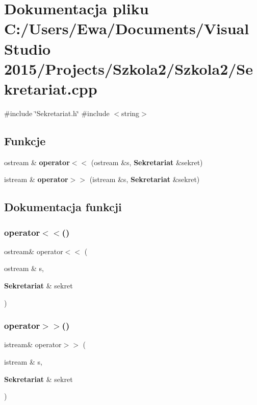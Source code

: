 \section{Dokumentacja pliku C\+:/\+Users/\+Ewa/\+Documents/\+Visual Studio 2015/\+Projects/\+Szkola2/\+Szkola2/\+Sekretariat.cpp}
\label{_sekretariat_8cpp}
{\ttfamily \#include \char`\"{}Sekretariat.\+h\char`\"{}}\newline
{\ttfamily \#include $<$string$>$}\newline
\subsection*{Funkcje}
\begin{DoxyCompactItemize}
\item 
ostream \& \textbf{ operator$<$$<$} (ostream \&s, \textbf{ Sekretariat} \&sekret)
\item 
istream \& \textbf{ operator$>$$>$} (istream \&s, \textbf{ Sekretariat} \&sekret)
\end{DoxyCompactItemize}


\subsection{Dokumentacja funkcji}
\mbox{\label{_sekretariat_8cpp_aca454e954cf7fe69e8efa639ee8e3fed}} 
\subsubsection{operator$<$$<$()}
{\footnotesize\ttfamily ostream\& operator$<$$<$ (\begin{DoxyParamCaption}\item[{ostream \&}]{s,  }\item[{\textbf{ Sekretariat} \&}]{sekret }\end{DoxyParamCaption})}

\mbox{\label{_sekretariat_8cpp_abb745528930b0ce605757ea9e58a29c6}} 
\subsubsection{operator$>$$>$()}
{\footnotesize\ttfamily istream\& operator$>$$>$ (\begin{DoxyParamCaption}\item[{istream \&}]{s,  }\item[{\textbf{ Sekretariat} \&}]{sekret }\end{DoxyParamCaption})}


